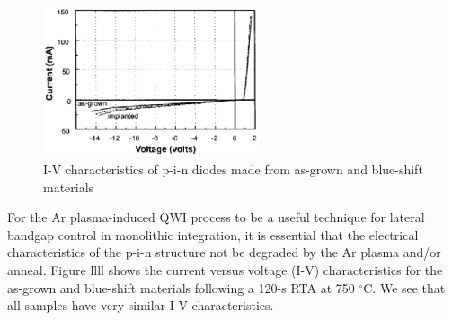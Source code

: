 \begin{figure}[!t]
    \centering
    \includegraphics[width=2.5in]{fig/iv}
    \caption{I-V characteristics of p-i-n diodes made from as-grown and blue-shift materials}
    \label{ex_iv}
\end{figure}
For the Ar plasma-induced QWI process to be a useful technique for
lateral bandgap control in monolithic integration, it is essential
that the electrical characteristics of the p-i-n structure not be
degraded by the Ar plasma and/or anneal. Figure llll shows the
current versus voltage (I-V) characteristics for the as-grown and
blue-shift materials following a 120-s RTA at 750 $^\circ$C. We see
that all samples have very similar I-V characteristics.
